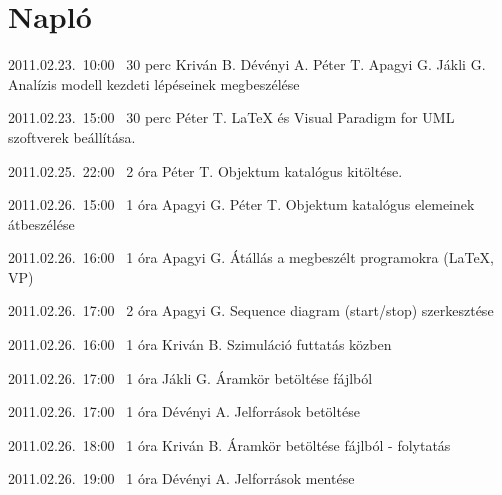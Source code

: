 %
\section{Napló}

\begin{naplo}

\bejegyzes
{2011.02.23.~10:00~} %
{30 perc} %
{Kriván B. \newline
Dévényi A. \newline
Péter T. \newline
Apagyi G. \newline
Jákli G.} %
{Analízis modell kezdeti lépéseinek megbeszélése} %

\bejegyzes
{2011.02.23.~15:00~}
{30 perc}
{Péter T.}
{\LaTeX{} és Visual Paradigm for UML szoftverek beállítása.}

\bejegyzes
{2011.02.25.~22:00~} %
{2 óra} %
{Péter T.} %
{Objektum katalógus kitöltése.} %

\bejegyzes
{2011.02.26.~15:00~} %
{1 óra} %
{Apagyi G. \newline
Péter T.} %
{Objektum katalógus elemeinek átbeszélése} %


\bejegyzes
{2011.02.26.~16:00~} %
{1 óra} %
{Apagyi G.} %
{Átállás a megbeszélt programokra (\LaTeX{}, VP)} %

\bejegyzes
{2011.02.26.~17:00~} %
{2 óra} %
{Apagyi G.} %
{Sequence diagram (start/stop) szerkesztése} %


\bejegyzes
{2011.02.26.~16:00~} %
{1 óra} %
{Kriván B.} %
{Szimuláció futtatás közben} %

\bejegyzes
{2011.02.26.~17:00~} %
{1 óra} %
{Jákli G.} %
{Áramkör betöltése fájlból} %

\bejegyzes
{2011.02.26.~17:00~} %
{1 óra} %
{Dévényi A.} %
{Jelforrások betöltése} %


\bejegyzes
{2011.02.26.~18:00~} %
{1 óra} %
{Kriván B.} %
{Áramkör betöltése fájlból - folytatás} %

\bejegyzes
{2011.02.26.~19:00~} %
{1 óra} %
{Dévényi A.} %
{Jelforrások mentése} %


\end{naplo}
